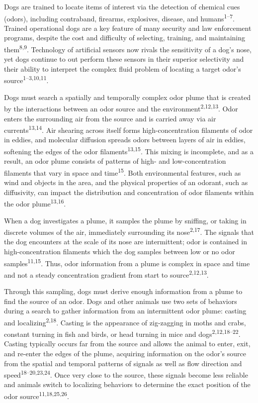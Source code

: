 \documentclass[
]{article}
\begin{document}
Dogs are trained to locate items of interest via the detection of chemical cues (odors), including contraband, firearms, explosives, disease, and humans\textsuperscript{1--7}. Trained operational dogs are a key feature of many security and law enforcement programs, despite the cost and difficulty of selecting, training, and maintaining them\textsuperscript{8,9}. Technology of artificial sensors now rivals the sensitivity of a dog's nose, yet dogs continue to out perform these sensors in their superior selectivity and their ability to interpret the complex fluid problem of locating a target odor's source\textsuperscript{1--3,10,11}.

Dogs must search a spatially and temporally complex odor plume that is created by the interactions between an odor source and the environment\textsuperscript{2,12,13}. Odor enters the surrounding air from the source and is carried away via air currents\textsuperscript{13,14}. Air shearing across itself forms high-concentration filaments of odor in eddies, and molecular diffusion spreads odors between layers of air in eddies, softening the edges of the odor filaments\textsuperscript{13,15}. This mixing is incomplete, and as a result, an odor plume consists of patterns of high- and low-concentration filaments that vary in space and time\textsuperscript{15}. Both environmental features, such as wind and objects in the area, and the physical properties of an odorant, such as diffusivity, can impact the distribution and concentration of odor filaments within the odor plume\textsuperscript{13,16}.

When a dog investigates a plume, it samples the plume by sniffing, or taking in discrete volumes of the air, immediately surrounding its nose\textsuperscript{2,17}. The signals that the dog encounters at the scale of its nose are intermittent; odor is contained in high-concentration filaments which the dog samples between low or no odor samples\textsuperscript{11,15}. Thus, odor information from a plume is complex in space and time and not a steady concentration gradient from start to source\textsuperscript{2,12,13}.

Through this sampling, dogs must derive enough information from a plume to find the source of an odor. Dogs and other animals use two sets of behaviors during a search to gather information from an intermittent odor plume: casting and localizing\textsuperscript{2,18}. Casting is the appearance of zig-zagging in moths and crabs, constant turning in fish and birds, or head turning in mice and dogs\textsuperscript{2,12,18--22}. Casting typically occurs far from the source and allows the animal to enter, exit, and re-enter the edges of the plume, acquiring information on the odor's source from the spatial and temporal patterns of signals as well as flow direction and speed\textsuperscript{18--20,23,24}. Once very close to the source, these signals become less reliable and animals switch to localizing behaviors to determine the exact position of the odor source\textsuperscript{11,18,25,26}.
\end{document}
